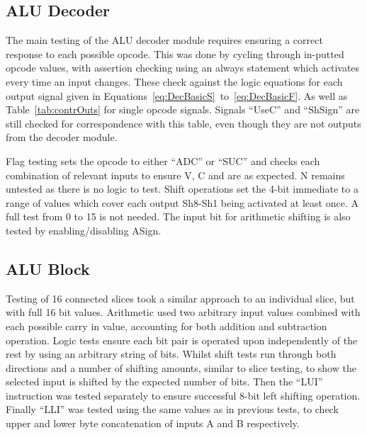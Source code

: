 \subsection{ALU Decoder}
The main testing of the ALU decoder module requires ensuring a correct response to each possible opcode. This was done by cycling through in-putted opcode values, with assertion checking using an always statement which activates every time an input changes. These check against the logic equations for each output signal given in Equations~\ref{eq:DecBasicS}~to~\ref{eq:DecBasicF}. As well as Table~\ref{tab:contrOuts} for single opcode signals. 
Signals ``UseC'' and ``ShSign'' are still checked for correspondence with this table, even though they are not outputs from the decoder module. 

Flag testing sets the opcode to either ``ADC'' or ``SUC'' and checks each combination of relevant inputs to ensure V, C and  are as expected. N remains untested as there is no logic to test. 
Shift operations set the 4-bit immediate to a range of values which cover each output Sh8-Sh1 being activated at least once. A full test from 0 to 15 is not needed. The input bit for arithmetic shifting is also tested by enabling/disabling ASign. 

\subsection{ALU Block}
Testing of 16 connected slices took a similar approach to an individual slice, but with full 16 bit values. Arithmetic used two arbitrary input values combined with each possible carry in value, accounting for both addition and subtraction operation. 
Logic tests ensure each bit pair is operated upon independently of the rest by using an arbitrary string of bits. 
Whilst shift tests run through both directions and a number of shifting amounts, similar to slice testing, to show the selected input is shifted by the expected number of bits. Then the ``LUI'' instruction was tested separately to ensure successful 8-bit left shifting operation. Finally ``LLI'' was tested using the same values as in previous tests, to check upper and lower byte concatenation of inputs A and B respectively. 
